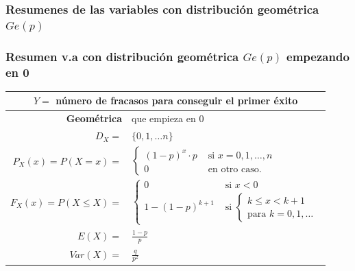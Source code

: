 \documentclass[handout]{beamer}\usepackage[]{graphicx}\usepackage[]{color}
\renewcommand{\leq}{\leqslant}
\theoremstyle{plain}
\theoremstyle{definition}
\begin{document}
\subsubsection{Resumenes de las variables con  distribución geométrica $Ge(p)$}
\begin{frame}

\frametitle{Resumen v.a con distribución geométrica $Ge(p)$ empezando en 0}
\scriptsize
\setlength{\tabcolsep}{1pt}
\begin{table}
\centering
\begin{tabular}{|rl|}
\hline 
\multicolumn{2}{|c|}{$Y=$ número de fracasos  para conseguir el primer éxito}\\ 
\hline
\hline
\textbf{Geométrica} &  que empieza en 0\\
\hline \hline 
$D_X=$&  $\{0,1,\ldots n\}$ \\\hline 
$P_X(x)=P(X=x)=$ & 
$\left\{
\begin{array}{ll}
  (1-p)^{x}\cdot p & \mbox{ si } x=0,1,\ldots,n\\
     0  & \mbox{ en otro caso.}
     \end{array}\right.$
\\ \hline 
$F_X(x)=P(X\leq X)=$ & $\left\{\begin{array}{ll} 0 & \mbox{ si } x<0\\
  1- (1-p)^{k+1} & \mbox{ si } \left\{ \begin{array}{l}k\leq x< k+1\\\mbox{para } k=0,1,\ldots\end{array}
    \right.\end{array}\right.$ \\\hline 
$E(X)=$ &  $\frac{1-p}{p}$ \\
$Var(X)=$ & $\frac{q}{p^2}$\\
\hline
\end{tabular}
\end{table}
\normalsize

\end{frame}
\end{document}
